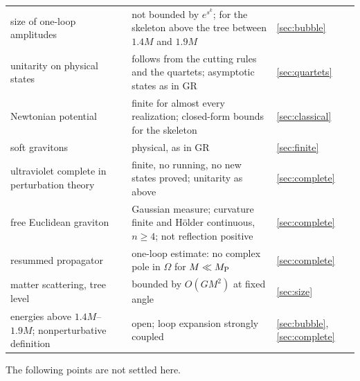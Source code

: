 \documentclass[aps,prd,10pt,twocolumn,superscriptaddress,nofootinbib,floatfix,longbibliography]{revtex4-2}
\begin{document}
\begin{table}[tp]
\begin{ruledtabular}
\begin{tabular}{p{4.6cm}p{9.9cm}p{2.0cm}}
size of one-loop amplitudes & not bounded by $e^{s^k}$; for the skeleton above the tree between $1.4M$ and $1.9M$ & \ref{sec:bubble}\\
unitarity on physical states & follows from the cutting rules and the quartets; asymptotic states as in GR & \ref{sec:quartets}\\
Newtonian potential & finite for almost every realization; closed-form bounds for the skeleton & \ref{sec:classical}\\
soft gravitons & physical, as in GR & \ref{sec:finite}\\
ultraviolet complete in perturbation theory & finite, no running, no new states proved; unitarity as above & \ref{sec:complete}\\
free Euclidean graviton & Gaussian measure; curvature finite and H\"older continuous, $n\ge4$; not reflection positive & \ref{sec:complete}\\
resummed propagator & one-loop estimate: no complex pole in $\Omega$ for $M\ll M_{\rm P}$ & \ref{sec:complete}\\
matter scattering, tree level & bounded by $O(GM^2)$ at fixed angle & \ref{sec:size}\\
energies above $1.4M$--$1.9M$; nonperturbative definition & open; loop expansion strongly coupled & \ref{sec:bubble}, \ref{sec:complete}\\
\end{tabular}
\end{ruledtabular}
\end{table}

The following points are not settled here.
\end{document}
